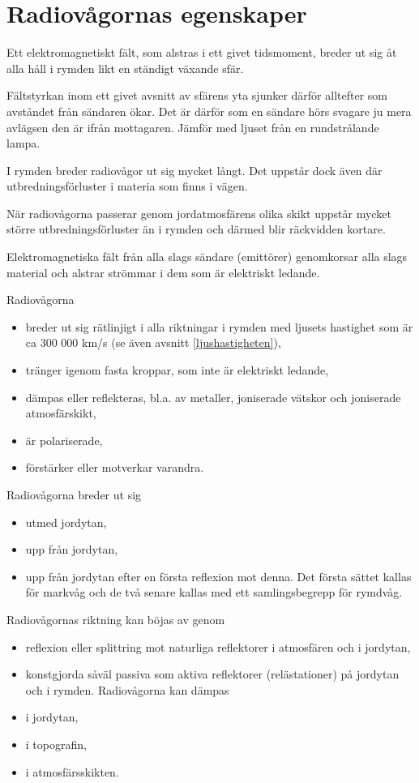 \section{Radiovågornas egenskaper}
\label{radiovågornasegenskaper}

Ett elektromagnetiskt fält, som alstras i ett givet tidsmoment, breder
ut sig åt alla håll i rymden likt en ständigt växande sfär.

Fältstyrkan inom ett givet avsnitt av sfärens yta sjunker därför
alltefter som avståndet från sändaren ökar. Det är därför som en
sändare hörs svagare ju mera avlägsen den är ifrån mottagaren. Jämför
med ljuset från en rundstrålande lampa.

I rymden breder radiovågor ut sig mycket långt. Det uppstår dock även
där utbredningsförluster i materia som finns i vägen.

När radiovågorna passerar genom jordatmosfärens olika skikt uppstår
mycket större utbredningsförluster än i rymden och därmed blir
räckvidden kortare.

Elektromagnetiska fält från alla slags sändare (emittörer) genomkorsar
alla slags material och alstrar strömmar i dem som är elektriskt
ledande.

Radiovågorna
\begin{itemize}
\item breder ut sig rätlinjigt i alla riktningar i rymden med ljusets
  hastighet som är ca 300 000 km/s (se även avsnitt \ref{ljushastigheten}),
\item tränger igenom fasta kroppar, som inte är elektriskt ledande,
\item dämpas eller reflekteras, bl.a. av metaller, joniserade vätskor
  och joniserade atmosfärskikt,
\item är polariserade,
\item förstärker eller motverkar varandra.
\end{itemize}
Radiovågorna breder ut sig
\begin{itemize}
\item utmed jordytan,
\item upp från jordytan,
\item upp från jordytan efter en första reflexion mot denna.  Det
  första sättet kallas för markvåg och de två senare kallas med ett
  samlingsbegrepp för rymdvåg.
\end{itemize}

Radiovågornas riktning kan böjas av genom
\begin{itemize}
\item reflexion eller splittring mot naturliga reflektorer i
  atmosfären och i jordytan,
\item konstgjorda såväl passiva som aktiva reflektorer (relästationer)
  på jordytan och i rymden.  Radiovågorna kan dämpas
\item i jordytan,
\item i topografin,
\item i atmosfärsskikten.
\end{itemize}

